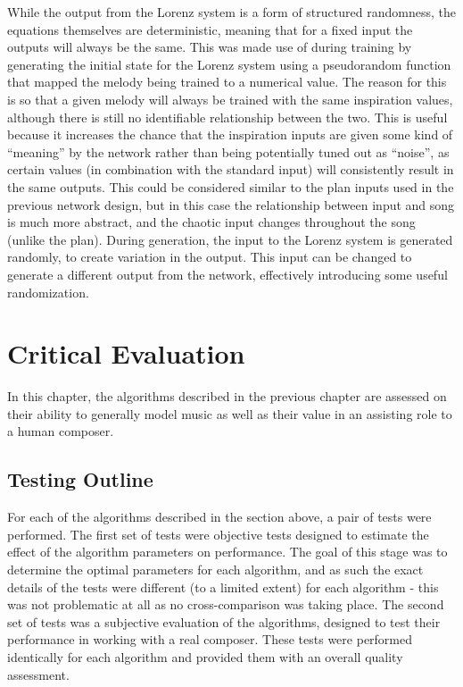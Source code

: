 \documentclass[ author={Stephen Livermore-Tozer},
				supervisor={Dr. Peter Flach},
				degree={MEng},
				title={Algorithmic Co-composition Using Machine Learning},
				subtitle={},
				type={research},
				year={2016} ]{dissertation}
\begin{document}
	While the output from the Lorenz system is a form of structured randomness, the equations themselves are deterministic, meaning that for a fixed input the outputs will always be the same. This was made use of during training by generating the initial state for the Lorenz system using a pseudorandom function that mapped the melody being trained to a numerical value. The reason for this is so that a given melody will always be trained with the same inspiration values, although there is still no identifiable relationship between the two. This is useful because it increases the chance that the inspiration inputs are given some kind of ``meaning'' by the network rather than being potentially tuned out as ``noise'', as certain values (in combination with the standard input) will consistently result in the same outputs. This could be considered similar to the plan inputs used in the previous network design, but in this case the relationship between input and song is much more abstract, and the chaotic input changes throughout the song (unlike the plan). During generation, the input to the Lorenz system is generated randomly, to create variation in the output. This input can be changed to generate a different output from the network, effectively introducing some useful randomization. 
	
	
	
	
	\chapter{Critical Evaluation}
	\label{chap:evaluation}
	
	In this chapter, the algorithms described in the previous chapter are assessed on their ability to generally model music as well as their value in an assisting role to a human composer. 
	
	\section{Testing Outline}
	
	For each of the algorithms described in the section above, a pair of tests were performed. The first set of tests were objective tests designed to estimate the effect of the algorithm parameters on performance. The goal of this stage was to determine the optimal parameters for each algorithm, and as such the exact details of the tests were different (to a limited extent) for each algorithm - this was not problematic at all as no cross-comparison was taking place. The second set of tests was a subjective evaluation of the algorithms, designed to test their performance in working with a real composer. These tests were performed identically for each algorithm and provided them with an overall quality assessment. 
	
\end{document}
